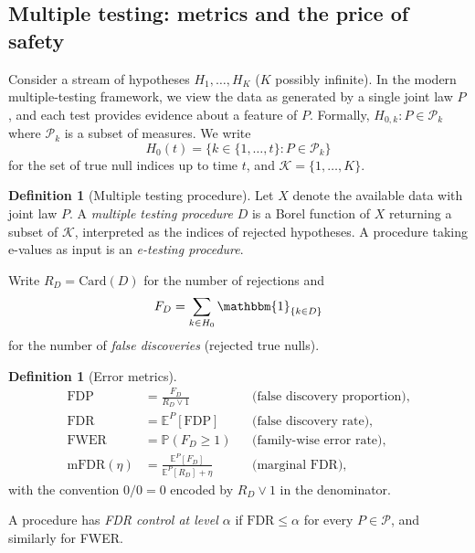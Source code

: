 \documentclass[11pt,a4paper]{article}
\theoremstyle{plain}
\theoremstyle{definition}
\newtheorem{definition}[theorem]{Definition}
\theoremstyle{remark}
\newcommand{\E}{\mathbb{E}}
\newcommand{\Prob}{\mathbb{P}}
\newcommand{\ind}{\mathbbm{1}}
\newcommand{\FDR}{\mathrm{FDR}}
\newcommand{\FDP}{\mathrm{FDP}}
\newcommand{\FWER}{\mathrm{FWER}}
\newcommand{\Card}{\mathrm{Card}}
\begin{document}
\subsection{Multiple testing: metrics and the price of safety}
\label{sec:metrics}

Consider a stream of hypotheses $H_1, \ldots, H_K$ ($K$ possibly infinite).
In the modern multiple-testing framework, we view the data as generated by a
single joint law $P$, and each test provides evidence about a feature of
$P$. Formally, $H_{0,k} : P \in \mathcal{P}_k$ where $\mathcal{P}_k$ is a
subset of measures. We write
\[
  H_0(t) = \{k \in \{1, \ldots, t\} : P \in \mathcal{P}_k\}
\]
for the set of true null indices up to time $t$, and $\mathcal{K} = \{1,
\ldots, K\}$.

\begin{definition}[Multiple testing procedure]
Let $X$ denote the available data with joint law $P$. A \emph{multiple
testing procedure} $D$ is a Borel function of $X$ returning a subset of
$\mathcal{K}$, interpreted as the indices of rejected hypotheses. A procedure
taking e-values as input is an \emph{e-testing procedure}.
\end{definition}

Write $R_D = \Card(D)$ for the number of rejections and
\[
  F_D = \sum_{k \in H_0} \ind_{\{k \in D\}}
\]
for the number of \emph{false discoveries} (rejected true nulls).

\begin{definition}[Error metrics]
\begin{align*}
  \FDP &= \frac{F_D}{R_D \vee 1}
    && \text{(false discovery proportion)},\\
  \FDR &= \E^P[\FDP]
    && \text{(false discovery rate)},\\
  \FWER &= \Prob(F_D \geq 1)
    && \text{(family-wise error rate)},\\
  \mathrm{mFDR}(\eta) &= \frac{\E^P[F_D]}{\E^P[R_D] + \eta}
    && \text{(marginal FDR)},
\end{align*}
with the convention $0/0 = 0$ encoded by $R_D \vee 1$ in the denominator.

A procedure has \emph{FDR control at level $\alpha$} if $\FDR \leq \alpha$
for every $P \in \mathcal{P}$, and similarly for FWER.
\end{definition}
\end{document}
